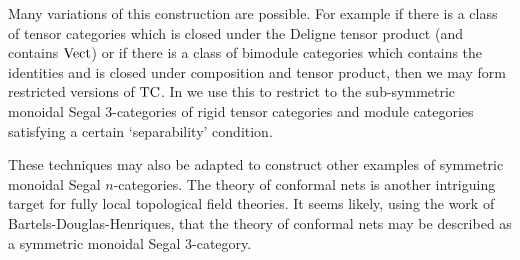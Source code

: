 \documentclass{amsart}
\begin{document}
Many variations of this construction are possible. For example if there is a class of tensor categories which is closed under the Deligne tensor product (and contains $\mathrm{Vect}$) or if there is a class of bimodule categories which contains the identities and is closed under composition and tensor product, then we may form restricted versions of $\mathrm{TC}$. In \cite{DSPS} we use this to restrict to the sub-symmetric monoidal Segal 3-categories of rigid tensor categories and module categories satisfying a certain `separability' condition.  

These techniques may also be adapted to construct other examples of symmetric monoidal Segal $n$-categories. The theory of conformal nets \cite{0912.5307} is another intriguing target for fully local topological field theories. It seems likely, using the work of Bartels-Douglas-Henriques, that the theory of conformal nets may be described as a symmetric monoidal Segal 3-category.  



\tikzexternalenable





\end{document}

